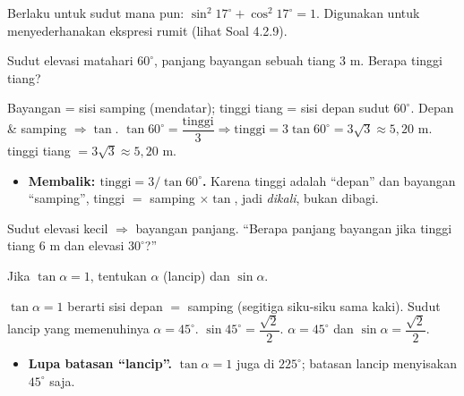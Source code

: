 \begin{variasi}
Berlaku untuk sudut mana pun: $\sin^2 17^\circ+\cos^2 17^\circ=1$. Digunakan
untuk menyederhanakan ekspresi rumit (lihat Soal 4.2.9).
\end{variasi}

\begin{soalbox}{}
Sudut elevasi matahari $60^\circ$, panjang bayangan sebuah tiang $3$ m. Berapa
tinggi tiang?
\end{soalbox}

\jawab
{} Bayangan = sisi samping (mendatar); tinggi tiang = sisi depan sudut
$60^\circ$. Depan \& samping $\Rightarrow\tan$.
 $\tan60^\circ=\dfrac{\text{tinggi}}{3}\Rightarrow
\text{tinggi}=3\tan60^\circ=3\sqrt3\approx5{,}20$ m.
\jadi tinggi tiang $=3\sqrt3\approx5{,}20$ m.

\begin{jebakan}
\begin{itemize}[leftmargin=*,topsep=2pt]
  \item \textbf{Membalik: $\text{tinggi}=3/\tan60^\circ$.} Karena tinggi adalah
  ``depan'' dan bayangan ``samping'', tinggi $=$ samping $\times\tan$, jadi
  \emph{dikali}, bukan dibagi.
\end{itemize}
\end{jebakan}

\begin{variasi}
Sudut elevasi kecil $\Rightarrow$ bayangan panjang. ``Berapa panjang bayangan
jika tinggi tiang $6$ m dan elevasi $30^\circ$?''
\end{variasi}

\begin{soalbox}{}
Jika $\tan\alpha=1$, tentukan $\alpha$ (lancip) dan $\sin\alpha$.
\end{soalbox}

\jawab
{} $\tan\alpha=1$ berarti sisi depan $=$ samping (segitiga siku-siku
sama kaki). Sudut lancip yang memenuhinya $\alpha=45^\circ$.
 $\sin45^\circ=\dfrac{\sqrt2}{2}$.
\jadi $\alpha=45^\circ$ dan $\sin\alpha=\dfrac{\sqrt2}{2}$.

\begin{jebakan}
\begin{itemize}[leftmargin=*,topsep=2pt]
  \item \textbf{Lupa batasan ``lancip''.} $\tan\alpha=1$ juga di $225^\circ$;
  batasan lancip menyisakan $45^\circ$ saja.
\end{itemize}
\end{jebakan}

